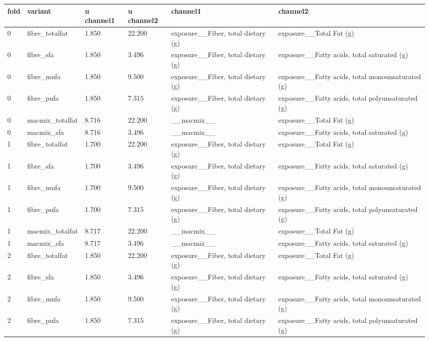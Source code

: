 {\footnotesize\setlength{\tabcolsep}{3pt}
\begin{longtable}{llllll}
\toprule
\textbf{fold} & \textbf{variant} & \textbf{u channel1} & \textbf{u channel2} & \textbf{channel1} & \textbf{channel2} \\
\midrule
\endhead
0 & fibre\_totalfat & 1.850 & 22.200 & exposure\_\_Fiber, total dietary (g) & exposure\_\_Total Fat (g) \\
0 & fibre\_sfa & 1.850 & 3.496 & exposure\_\_Fiber, total dietary (g) & exposure\_\_Fatty acids, total saturated (g) \\
0 & fibre\_mufa & 1.850 & 9.500 & exposure\_\_Fiber, total dietary (g) & exposure\_\_Fatty acids, total monounsaturated (g) \\
0 & fibre\_pufa & 1.850 & 7.315 & exposure\_\_Fiber, total dietary (g) & exposure\_\_Fatty acids, total polyunsaturated (g) \\
0 & macmix\_totalfat & 8.716 & 22.200 & \_\_macmix\_\_ & exposure\_\_Total Fat (g) \\
0 & macmix\_sfa & 8.716 & 3.496 & \_\_macmix\_\_ & exposure\_\_Fatty acids, total saturated (g) \\
1 & fibre\_totalfat & 1.700 & 22.200 & exposure\_\_Fiber, total dietary (g) & exposure\_\_Total Fat (g) \\
1 & fibre\_sfa & 1.700 & 3.496 & exposure\_\_Fiber, total dietary (g) & exposure\_\_Fatty acids, total saturated (g) \\
1 & fibre\_mufa & 1.700 & 9.500 & exposure\_\_Fiber, total dietary (g) & exposure\_\_Fatty acids, total monounsaturated (g) \\
1 & fibre\_pufa & 1.700 & 7.315 & exposure\_\_Fiber, total dietary (g) & exposure\_\_Fatty acids, total polyunsaturated (g) \\
1 & macmix\_totalfat & 8.717 & 22.200 & \_\_macmix\_\_ & exposure\_\_Total Fat (g) \\
1 & macmix\_sfa & 8.717 & 3.496 & \_\_macmix\_\_ & exposure\_\_Fatty acids, total saturated (g) \\
2 & fibre\_totalfat & 1.850 & 22.200 & exposure\_\_Fiber, total dietary (g) & exposure\_\_Total Fat (g) \\
2 & fibre\_sfa & 1.850 & 3.496 & exposure\_\_Fiber, total dietary (g) & exposure\_\_Fatty acids, total saturated (g) \\
2 & fibre\_mufa & 1.850 & 9.500 & exposure\_\_Fiber, total dietary (g) & exposure\_\_Fatty acids, total monounsaturated (g) \\
2 & fibre\_pufa & 1.850 & 7.315 & exposure\_\_Fiber, total dietary (g) & exposure\_\_Fatty acids, total polyunsaturated (g) \\

\end{longtable}}
